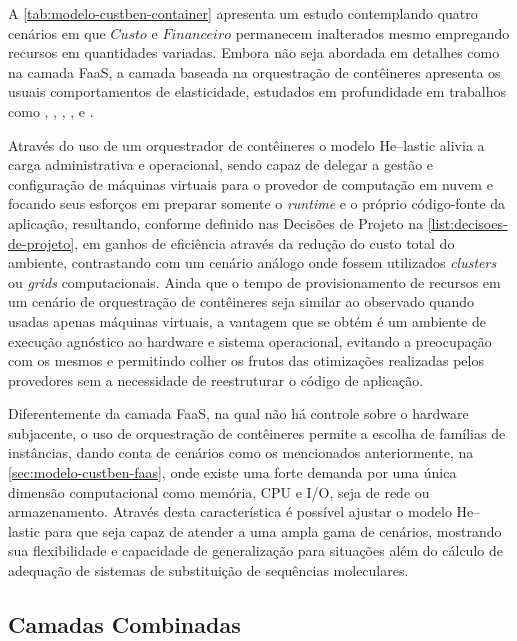 \documentclass[english,brazilian]{UNISINOSmonografia} %
\begin{document}
A \autoref{tab:modelo-custben-container} apresenta um estudo contemplando quatro cenários em que $ Custo $ e $ Financeiro $ permanecem inalterados mesmo empregando recursos em quantidades variadas.
Embora não seja abordada em detalhes como na camada FaaS, a camada baseada na orquestração de contêineres apresenta os usuais comportamentos de elasticidade, estudados em profundidade em trabalhos como , , , ,  e .


Através do uso de um orquestrador de contêineres o modelo \textsf{He}--lastic alivia a carga administrativa e operacional, sendo capaz de delegar a gestão e configuração de máquinas virtuais para o provedor de computação em nuvem e focando seus esforços em preparar somente o \textit{runtime} e o próprio código-fonte da aplicação, resultando, conforme definido nas Decisões de Projeto na \autoref{list:decisoes-de-projeto}, em ganhos de eficiência através da redução do custo total do ambiente, contrastando com um cenário análogo onde fossem utilizados \textit{clusters} ou \textit{grids} computacionais.
Ainda que o tempo de provisionamento de recursos em um cenário de orquestração de contêineres seja similar ao observado quando usadas apenas máquinas virtuais, a vantagem que se obtém é um ambiente de execução agnóstico ao hardware e sistema operacional, evitando a preocupação com os mesmos e permitindo colher os frutos das otimizações realizadas pelos provedores sem a necessidade de reestruturar o código de aplicação.


Diferentemente da camada FaaS, na qual não há controle sobre o hardware subjacente, o uso de orquestração de contêineres permite a escolha de famílias de instâncias, dando conta de cenários como os mencionados anteriormente, na \autoref{sec:modelo-custben-faas}, onde existe uma forte demanda por uma única dimensão computacional como memória, CPU e I/O, seja de rede ou armazenamento.
Através desta característica é possível ajustar o modelo \textsf{He}--lastic para que seja capaz de atender a uma ampla gama de cenários, mostrando sua flexibilidade e capacidade de generalização para situações além do cálculo de adequação de sistemas de substituição de sequências moleculares.






\subsection{Camadas Combinadas}
\end{document}
